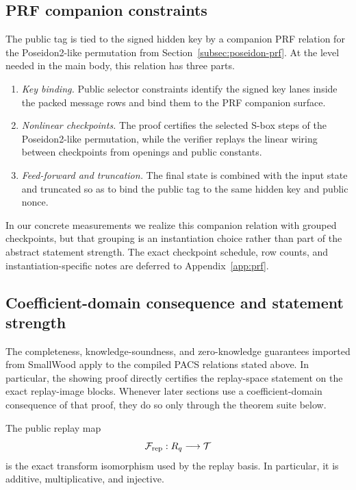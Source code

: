 \subsection{PRF companion constraints}
\label{subsec:prf-checkpointed}
\label{subsec:prf-constraints}
The public tag is tied to the signed hidden key by a companion PRF relation for the Poseidon2-like permutation from
Section~\ref{subsec:poseidon-prf}. At the level needed in the main body, this relation has three parts.
\begin{enumerate}[leftmargin=1.25em]
    \item \emph{Key binding.} Public selector constraints identify the signed key lanes inside the packed message rows
    and bind them to the PRF companion surface.
    \item \emph{Nonlinear checkpoints.} The proof certifies the selected S-box steps of the Poseidon2-like permutation,
    while the verifier replays the linear wiring between checkpoints from openings and public constants.
    \item \emph{Feed-forward and truncation.} The final state is combined with the input state and truncated so as to
    bind the public tag to the same hidden key and public nonce.
\end{enumerate}
In our concrete measurements we realize this companion relation with grouped checkpoints, but that grouping is an
instantiation choice rather than part of the abstract statement strength. The exact checkpoint schedule, row counts, and
instantiation-specific notes are deferred to Appendix~\ref{app:prf}.

\subsection{Coefficient-domain consequence and statement strength}
\label{subsec:statement-strength}
The completeness, knowledge-soundness, and zero-knowledge guarantees imported from SmallWood apply to the compiled PACS
relations stated above. In particular, the showing proof directly certifies the replay-space statement on the exact
replay-image blocks. Whenever later sections use a coefficient-domain consequence of that proof, they do so only through
the theorem suite below.

\begin{lemma}\label{lem:replay-transform}
The public replay map
\[
\mathcal F_{\mathrm{rep}} : R_q \longrightarrow \mathcal T
\]
is the exact transform isomorphism used by the replay basis. In particular, it is additive, multiplicative, and
injective.
\end{lemma}

